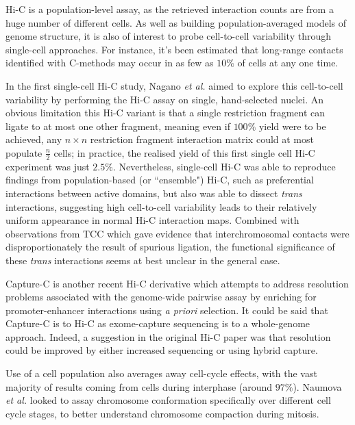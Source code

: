 \documentclass[a4paper,10pt,oneside]{book}
\begin{document}
Hi-C is a population-level assay, as the retrieved interaction counts are from a huge number of different cells. As well as building population-averaged models of genome structure, it is also of interest to probe cell-to-cell variability through single-cell approaches. For instance, it's been estimated that long-range contacts identified with C-methods may occur in as few as $10\%$ of cells at any one time.\cite{VanSteensel2010} 

In the first single-cell Hi-C study, Nagano \emph{et al.}\cite{Nagano2013} aimed to explore this cell-to-cell variability by performing the Hi-C assay on single, hand-selected nuclei. An obvious limitation this Hi-C variant is that a single restriction fragment can ligate to at most one other fragment, meaning even if $100\%$ yield were to be achieved, any $n \times n$ restriction fragment interaction matrix could at most populate $\frac{n}{2}$ cells; in practice, the realised yield of this first single cell Hi-C experiment was just $2.5\%$.\cite{Nagano2013} Nevertheless, single-cell Hi-C was able to reproduce findings from population-based (or ``ensemble") Hi-C, such as preferential interactions between active domains, but also was able to dissect \emph{trans} interactions, suggesting high cell-to-cell variability leads to their relatively uniform appearance in normal Hi-C interaction maps.\cite{Nagano2013} Combined with observations from TCC which gave evidence that interchromosomal contacts were disproportionately the result of spurious ligation,\cite{Kalhor2012} the functional significance of these \emph{trans} interactions seems at best unclear in the general case.

Capture-C is another recent Hi-C derivative which attempts to address resolution problems associated with the genome-wide pairwise assay by enriching for promoter-enhancer interactions using \emph{a priori} selection.\cite{Mifsud2015} It could be said that Capture-C is to Hi-C as exome-capture sequencing is to a whole-genome approach. Indeed, a suggestion in the original Hi-C paper was that resolution could be improved by either increased sequencing or using hybrid capture.\cite{Lieberman2009}

Use of a cell population also averages away cell-cycle effects, with the vast majority of results coming from cells during interphase (around $97\%$\cite{Naumova2013}). Naumova \emph{et al.}\cite{Naumova2013} looked to assay chromosome conformation specifically over different cell cycle stages, to better understand chromosome compaction during mitosis.
\end{document}
